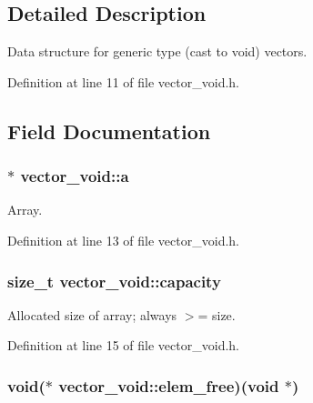 \subsection{Detailed Description}
Data structure for generic type (cast to void) vectors. 

Definition at line 11 of file vector\-\_\-void.\-h.



\subsection{Field Documentation}
\hypertarget{structvector__void_aae6cbf085d4de1f6ba3adab1aa7c7585}{
\subsubsection[{a}]{$\ast$ vector\-\_\-void\-::a}}\label{structvector__void_aae6cbf085d4de1f6ba3adab1aa7c7585}


Array. 



Definition at line 13 of file vector\-\_\-void.\-h.

\hypertarget{structvector__void_a440146243caeb1d285111fdd54e1006f}{
\subsubsection[{capacity}]{\setlength{\rightskip}{0pt plus 5cm}size\-\_\-t vector\-\_\-void\-::capacity}}\label{structvector__void_a440146243caeb1d285111fdd54e1006f}


Allocated size of array; always $>$= size. 



Definition at line 15 of file vector\-\_\-void.\-h.

\hypertarget{structvector__void_abed2ac06e76256419b825b31e879b204}{
\subsubsection[{elem\-\_\-free}]{\setlength{\rightskip}{0pt plus 5cm}void($\ast$ vector\-\_\-void\-::elem\-\_\-free)(void $\ast$)}}\label{structvector__void_abed2ac06e76256419b825b31e879b204}


